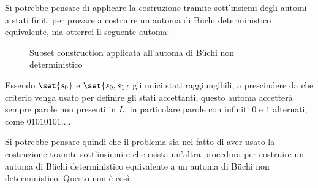 Si potrebbe pensare di applicare la costruzione tramite sott'insiemi degli automi a stati finiti per provare a costruire un automa di Büchi deterministico equivalente, ma otterrei il seguente automa:

\begin{figure}[H]
  \centering
  \caption{Subset construction applicata all'automa di Büchi non deterministico}\label{fig:buchi_subset_construction}
\end{figure}

Essendo \(\set{s_0}\) e \(\set{s_0,s_1}\) gli unici stati raggiungibili, a prescindere da che criterio venga usato per definire gli stati accettanti, questo automa accetterà sempre parole non presenti in \(L\), in particolare parole con infiniti \(0\) e \(1\) alternati, come \(01010101\ldots\).

Si potrebbe pensare quindi che il problema sia nel fatto di aver usato la costruzione tramite sott'insiemi e che esista un'altra procedura per costruire un automa di Büchi deterministico equivalente a un automa di Büchi non deterministico. Questo non è così.

